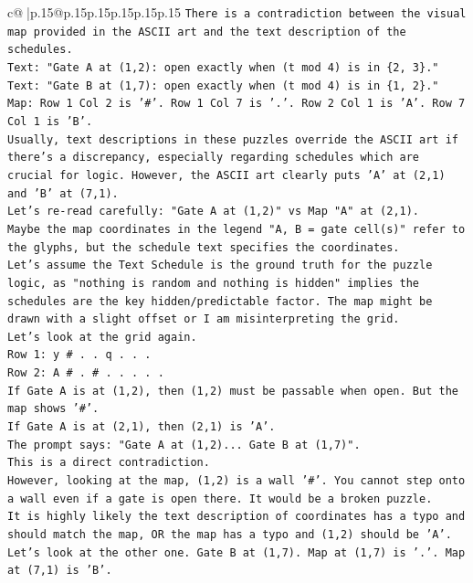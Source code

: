 \documentclass{article}
\begin{document}
{\begin{supertabular}{c@{$\;$}|p{.15\linewidth}@{}p{.15\linewidth}p{.15\linewidth}p{.15\linewidth}p{.15\linewidth}p{.15\linewidth}}
{{{\texttt{There is a contradiction between the visual map provided in the ASCII art and the text description of the schedules.} \\
\texttt{Text: "Gate A at (1,2): open exactly when (t mod 4) is in \{2, 3\}."} \\
\texttt{Text: "Gate B at (1,7): open exactly when (t mod 4) is in \{1, 2\}."} \\
\texttt{Map: Row 1 Col 2 is '\#'. Row 1 Col 7 is '.'. Row 2 Col 1 is 'A'. Row 7 Col 1 is 'B'.} \\
\texttt{Usually, text descriptions in these puzzles override the ASCII art if there's a discrepancy, especially regarding schedules which are crucial for logic. However, the ASCII art clearly puts 'A' at (2,1) and 'B' at (7,1).} \\
\texttt{Let's re{-}read carefully: "Gate A at (1,2)" vs Map "A" at (2,1).} \\
\texttt{Maybe the map coordinates in the legend "A, B = gate cell(s)" refer to the glyphs, but the schedule text specifies the coordinates.} \\
\texttt{Let's assume the Text Schedule is the ground truth for the puzzle logic, as "nothing is random and nothing is hidden" implies the schedules are the key hidden/predictable factor. The map might be drawn with a slight offset or I am misinterpreting the grid.} \\
\texttt{Let's look at the grid again.} \\
\texttt{Row 1: y \# . . q . . .} \\
\texttt{Row 2: A \# . \# . . . . .} \\
\texttt{If Gate A is at (1,2), then (1,2) must be passable when open. But the map shows '\#'.} \\
\texttt{If Gate A is at (2,1), then (2,1) is 'A'.} \\
\texttt{The prompt says: "Gate A at (1,2)... Gate B at (1,7)".} \\
\texttt{This is a direct contradiction.} \\
\texttt{However, looking at the map, (1,2) is a wall '\#'. You cannot step onto a wall even if a gate is open there. It would be a broken puzzle.} \\
\texttt{It is highly likely the text description of coordinates has a typo and should match the map, OR the map has a typo and (1,2) should be 'A'.} \\
\texttt{Let's look at the other one. Gate B at (1,7). Map at (1,7) is '.'. Map at (7,1) is 'B'.} \\
}}}
\end{supertabular}}
\end{document}
